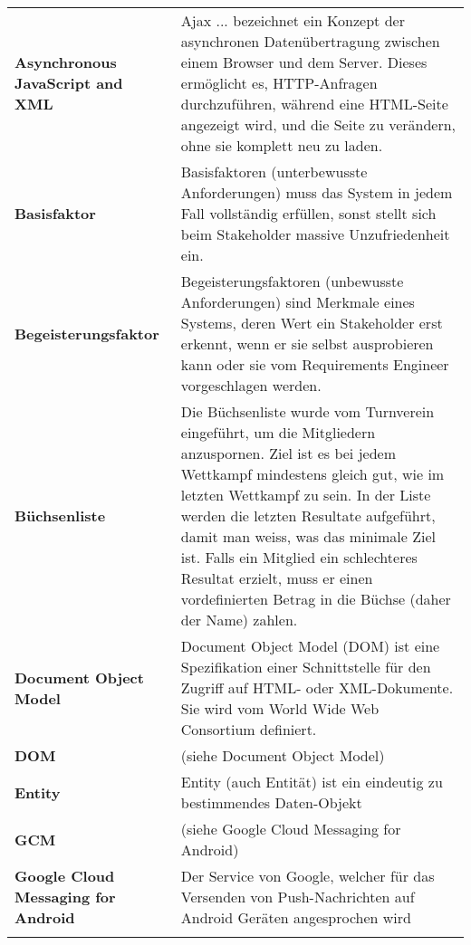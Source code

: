\begin{longtable}{>{\raggedright}m{3cm}m{11cm}}
	\textbf{Asynchronous JavaScript and XML}&
	Ajax ... bezeichnet ein Konzept der asynchronen Datenübertragung zwischen einem Browser und dem Server. Dieses ermöglicht es, HTTP-Anfragen durchzuführen, während eine HTML-Seite angezeigt wird, und die Seite zu verändern, ohne sie komplett neu zu laden.\cite{wiki_ajax}\\ \addlinespace	

	\textbf{Basisfaktor}&
	Basisfaktoren (unterbewusste Anforderungen) muss das System in jedem Fall vollständig erfüllen, sonst stellt sich beim Stakeholder massive Unzufriedenheit ein. \cite{req_eng_book}\\ \addlinespace	

	\textbf{Begeisterungsfaktor}&
	Begeisterungsfaktoren (unbewusste Anforderungen) sind Merkmale eines Systems, deren Wert ein Stakeholder erst erkennt, wenn er sie selbst ausprobieren kann oder sie vom Requirements Engineer vorgeschlagen werden.\cite{req_eng_book}\\ \addlinespace	

	\textbf{Büchsenliste}&
	Die Büchsenliste wurde vom Turnverein eingeführt, um die Mitgliedern anzuspornen. Ziel ist es bei jedem Wettkampf mindestens gleich gut, wie im letzten Wettkampf zu sein. In der Liste werden die letzten Resultate aufgeführt, damit man weiss, was das minimale Ziel ist. Falls ein Mitglied ein schlechteres Resultat erzielt, muss er einen vordefinierten Betrag in die Büchse (daher der Name) zahlen.\\ \addlinespace	

	\textbf{Document Object Model}&
	 Document Object Model (DOM) ist eine Spezifikation einer Schnittstelle für den Zugriff auf HTML- oder XML-Dokumente. Sie wird vom World Wide Web Consortium definiert.\cite{wiki_dom}\\ \addlinespace	

	\textbf{DOM}&
	 (siehe Document Object Model)\\ \addlinespace	

	\textbf{Entity}&
	Entity (auch Entität) ist ein eindeutig zu bestimmendes Daten-Objekt \\ \addlinespace	

	\textbf{GCM}&
	(siehe Google Cloud Messaging for Android)\\ \addlinespace

	\textbf{Google Cloud Messaging for Android}&
	Der Service von Google, welcher für das Versenden von Push-Nachrichten auf Android Geräten angesprochen wird\\ \addlinespace	


\end{longtable}
